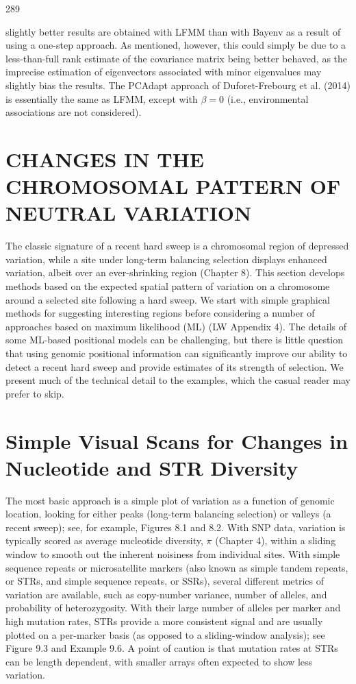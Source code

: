 \documentclass{article}
\begin{document}
289

slightly better results are obtained with LFMM than with Bayenv as a result of using a one-step approach. As mentioned, however, this could simply be due to a less-than-full rank estimate of the covariance matrix being better behaved, as the imprecise estimation of eigenvectors associated with minor eigenvalues may slightly bias the results. The PCAdapt approach of Duforet-Frebourg et al. (2014) is essentially the same as LFMM, except with  $ \beta = 0 $ (i.e., environmental associations are not considered).

\section{CHANGES IN THE CHROMOSOMAL PATTERN OF NEUTRAL VARIATION}
The classic signature of a recent hard sweep is a chromosomal region of depressed variation, while a site under long-term balancing selection displays enhanced variation, albeit over an ever-shrinking region (Chapter 8). This section develops methods based on the expected spatial pattern of variation on a chromosome around a selected site following a hard sweep. We start with simple graphical methods for suggesting interesting regions before considering a number of approaches based on maximum likelihood (ML) (LW Appendix 4). The details of some ML-based positional models can be challenging, but there is little question that using genomic positional information can significantly improve our ability to detect a recent hard sweep and provide estimates of its strength of selection. We present much of the technical detail to the examples, which the casual reader may prefer to skip.

\section{Simple Visual Scans for Changes in Nucleotide and STR Diversity}
The most basic approach is a simple plot of variation as a function of genomic location, looking for either peaks (long-term balancing selection) or valleys (a recent sweep); see, for example, Figures 8.1 and 8.2. With SNP data, variation is typically scored as average nucleotide diversity,  $ \pi $ (Chapter 4), within a sliding window to smooth out the inherent noisiness from individual sites. With simple sequence repeats or microsatellite markers (also known as simple tandem repeats, or STRs, and simple sequence repeats, or SSRs), several different metrics of variation are available, such as copy-number variance, number of alleles, and probability of heterozygosity. With their large number of alleles per marker and high mutation rates, STRs provide a more consistent signal and are usually plotted on a per-marker basis (as opposed to a sliding-window analysis); see Figure 9.3 and Example 9.6. A point of caution is that mutation rates at STRs can be length dependent, with smaller arrays often expected to show less variation.
\end{document}
